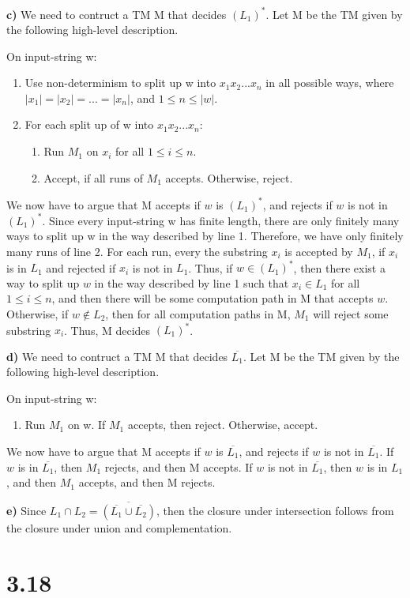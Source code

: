 \documentclass[12pt]{article}
\begin{document}
\textbf{c)} We need to contruct a TM M that decides $(L_1)^*$. Let M be the TM given by the following high-level description.

On input-string w:
\begin{enumerate}
\item Use non-determinism to split up w into $x_1x_2...x_n$ in all possible ways, where $|x_1|=|x_2|=...=|x_n|$, and $1\leq n \leq |w|$.
\item For each split up of w into $x_1x_2...x_n$:
\begin{enumerate}
\item Run $M_1$ on $x_i$ for all $1\leq i \leq n$.
\item Accept, if all runs of $M_1$ accepts. Otherwise, reject.
\end{enumerate} 
\end{enumerate}
We now have to argue that M accepts if $w$ is $(L_1)^*$, and rejects if $w$ is not in $(L_1)^*$. Since every input-string w has finite length, there are only finitely many ways to split up w in the way described by line 1. Therefore, we have only finitely many runs of line 2. For each run, every the substring $x_i$ is accepted by $M_1$, if $x_i$ is in $L_1$ and rejected if $x_i$ is not in $L_1$. Thus, if $w\in (L_1)^*$, then there exist a way to split up $w$ in the way described by line 1 such that $x_i \in L_1$ for all $1\leq i \leq n$, and then there will be some computation path in M that accepts $w$. Otherwise, if $w\notin L_2$, then for all computation paths in M, $M_1$ will reject some substring $x_i$. Thus, M decides $(L_1)^*$.

\textbf{d)} We need to contruct a TM M that decides $\overline{L_1}$. Let M be the TM given by the following high-level description.

On input-string w:
\begin{enumerate}
\item Run $M_1$ on w. If $M_1$ accepts, then reject. Otherwise, accept. 
\end{enumerate}
We now have to argue that M accepts if $w$ is $\overline{L_1}$, and rejects if $w$ is not in $\overline{L_1}$. If $w$ is in $\overline{L_1}$, then $M_1$ rejects, and then M accepts. If $w$ is not in $\overline{L_1}$, then $w$ is in $L_1$, and then $M_1$ accepts, and then M rejects. 

\textbf{e)} Since $L_1 \cap L_2=\overline{(\overline{L_1}\cup \overline{L_2})}$, then the closure under intersection follows from the closure under union and complementation.

\section*{3.18}
\end{document}

